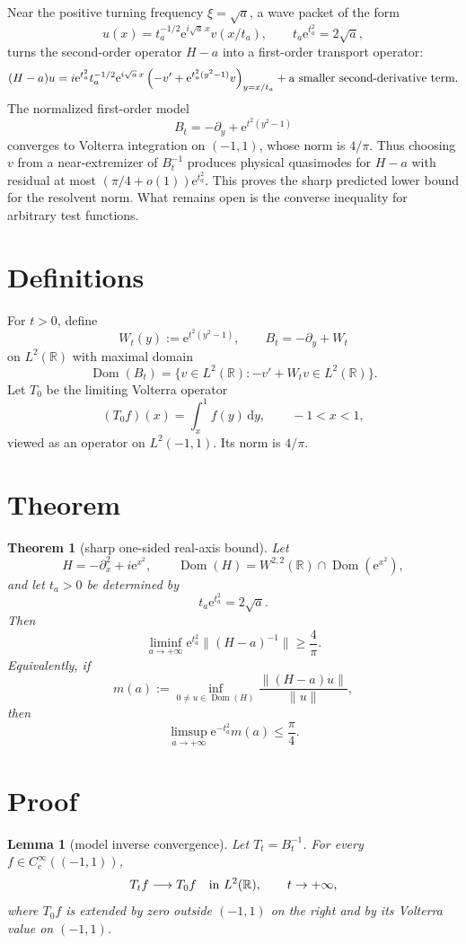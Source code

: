 \documentclass[11pt]{article}
\newtheorem{theorem}{Theorem}
\newtheorem{lemma}{Lemma}
\newcommand{\R}{\mathbb R}
\newcommand{\Dom}{\operatorname{Dom}}
\newcommand{\e}{\mathrm e}
\newcommand{\dd}{\mathrm d}
\begin{document}
Near the positive turning frequency \(\xi=\sqrt a\), a wave packet of the form
\[
    u(x)=t_a^{-1/2}\e^{i\sqrt a\,x}v(x/t_a),
    \qquad t_a\e^{t_a^2}=2\sqrt a,
\]
turns the second-order operator \(H-a\) into a first-order transport operator:
\[
    (H-a)u
    =i\e^{t_a^2}t_a^{-1/2}\e^{i\sqrt a\,x}
      \left(-v'+\e^{t_a^2(y^2-1)}v\right)_{y=x/t_a}
      +\hbox{a smaller second-derivative term}.
\]
The normalized first-order model
\[
    B_t=-\partial_y+\e^{t^2(y^2-1)}
\]
converges to Volterra integration on \((-1,1)\), whose norm is \(4/\pi\).
Thus choosing \(v\) from a near-extremizer of \(B_t^{-1}\) produces physical
quasimodes for \(H-a\) with residual at most
\((\pi/4+o(1))\e^{t_a^2}\).  This proves the sharp predicted lower bound for
the resolvent norm.  What remains open is the converse inequality for arbitrary
test functions.

\section*{Definitions}

For \(t>0\), define
\[
    W_t(y):=\e^{t^2(y^2-1)},\qquad
    B_t=-\partial_y+W_t
\]
on \(L^2(\R)\) with maximal domain
\[
    \Dom(B_t)=\{v\in L^2(\R): -v'+W_tv\in L^2(\R)\}.
\]
Let \(T_0\) be the limiting Volterra operator
\[
    (T_0 f)(x)=\int_x^1 f(y)\,\dd y,\qquad -1<x<1,
\]
viewed as an operator on \(L^2(-1,1)\).  Its norm is \(4/\pi\).

\section*{Theorem}

\begin{theorem}[sharp one-sided real-axis bound]\label{thm:lower}
Let
\[
    H=-\partial_x^2+i\e^{x^2},
    \qquad \Dom(H)=W^{2,2}(\R)\cap\Dom(\e^{x^2}),
\]
and let \(t_a>0\) be determined by
\[
    t_a\e^{t_a^2}=2\sqrt a.
\]
Then
\[
    \liminf_{a\to+\infty} \e^{t_a^2}\|(H-a)^{-1}\|\ge \frac4\pi.
\]
Equivalently, if
\[
    m(a):=\inf_{0\ne u\in\Dom(H)}
      \frac{\|(H-a)u\|}{\|u\|},
\]
then
\[
    \limsup_{a\to+\infty} \e^{-t_a^2}m(a)\le\frac\pi4.
\]
\end{theorem}

\section*{Proof}

\begin{lemma}[model inverse convergence]\label{lem:model}
Let \(T_t=B_t^{-1}\).  For every \(f\in C_c^\infty((-1,1))\),
\[
    T_t f \longrightarrow T_0 f
    \quad\hbox{in }L^2(\R),\qquad t\to+\infty,
\]
where \(T_0f\) is extended by zero outside \((-1,1)\) on the right and by its
Volterra value on \((-1,1)\).
\end{lemma}
\end{document}
